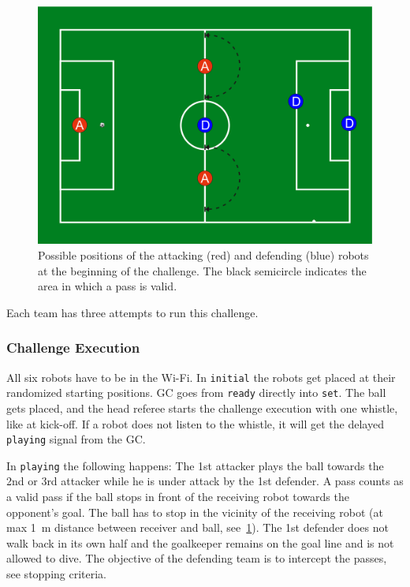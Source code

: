         \begin{figure}[t!]
            \begin{center}
                \leavevmode
                \includegraphics[width=1\columnwidth]{figs/ball_handling_positions.pdf}
                \caption{Possible positions of the attacking (red) and defending (blue) robots at the beginning of the challenge. The black semicircle indicates the area in which a pass is valid.}
                \label{fig:ball_handling_positions}
            \end{center}
        \end{figure}

    Each team has three attempts to run this challenge.

    \subsubsection{Challenge Execution}

        All six robots have to be in the Wi-Fi. In \texttt{initial} the robots get placed at their randomized starting positions. GC goes from \texttt{ready} directly into \texttt{set}. The ball gets placed, and the head referee starts the challenge execution with one whistle, like at kick-off. If a robot does not listen to the whistle, it will get the delayed \texttt{playing} signal from the GC.

        In \texttt{playing} the following happens: The 1st attacker plays the ball towards the 2nd or 3rd attacker while he is under attack by the 1st defender.
        A pass counts as a valid pass if the ball stops in front of the receiving robot towards the opponent's goal. The ball has to stop in the vicinity of the receiving robot (at max \qty{1}{\metre} distance between receiver and ball, see~\cref{fig:ball_handling_positions}).
        The 1st defender does not walk back in its own half and the goalkeeper remains on the goal line and is not allowed to dive. The objective of the defending team is to intercept the passes, see stopping criteria.


